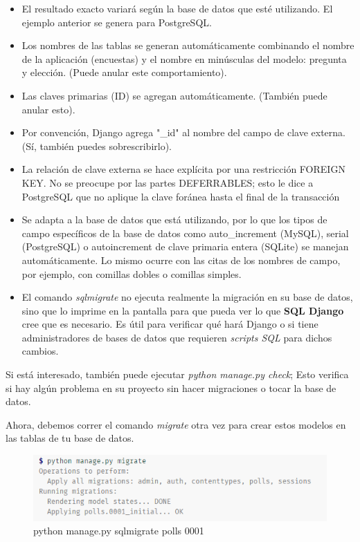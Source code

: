 \documentclass[10pt]{article}
\newcommand{\django}[1]{{\textcolor{G}{Django} #1}}
\begin{document}
\begin{itemize}
\item 
El resultado exacto variará según la base de datos que esté utilizando. El ejemplo anterior se genera para PostgreSQL.

\item
Los nombres de las tablas se generan automáticamente combinando el nombre de la aplicación (encuestas) y el nombre en minúsculas del modelo: pregunta y elección. (Puede anular este comportamiento).

\item 
Las claves primarias (ID) se agregan automáticamente. (También puede anular esto).

\item 
Por convención, \django{} agrega "\_id" al nombre del campo de clave externa. (Sí, también puedes sobrescribirlo).

\item 
La relación de clave externa se hace explícita por una restricción FOREIGN KEY. No se preocupe por las partes DEFERRABLES; esto le dice a PostgreSQL que no aplique la clave foránea hasta el final de la transacción

\item 
Se adapta a la base de datos que está utilizando, por lo que los tipos de campo específicos de la base de datos como auto\_increment (MySQL), serial (PostgreSQL) o autoincrement de clave primaria entera (SQLite) se manejan automáticamente. Lo mismo ocurre con las citas de los nombres de campo, por ejemplo, con comillas dobles o comillas simples.

\item 
El comando \textit{sqlmigrate} no ejecuta realmente la migración en su base de datos, sino que lo imprime en la pantalla para que pueda ver lo que \textbf{SQL Django} cree que es necesario. Es útil para verificar qué hará \django{} o si tiene administradores de bases de datos que requieren \textit{scripts SQL} para dichos cambios.
\end{itemize}

Si está interesado, también puede ejecutar \textit{python manage.py check}; Esto verifica si hay algún problema en su proyecto sin hacer migraciones o tocar la base de datos.

Ahora, debemos correr el comando \textit{migrate} otra vez para crear estos modelos en las tablas de tu base de datos.

\begin{figure}[H]
\begin{center}
\includegraphics[scale=1]{figuras/323/img4.png}
\renewcommand{\arraystretch}{1.3}
\caption{python manage.py sqlmigrate polls 0001}
\end{center}
\end{figure}
\end{document}
